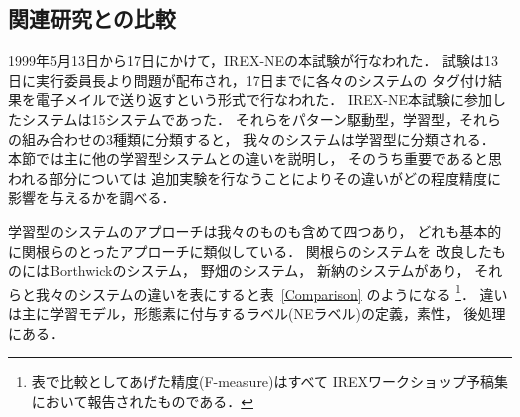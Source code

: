 \subsection{関連研究との比較}
\label{sec:related_work}

1999年5月13日から17日にかけて，IREX-NEの本試験が行なわれた．
試験は13日に実行委員長より問題が配布され，17日までに各々のシステムの
タグ付け結果を電子メイルで送り返すという形式で行なわれた．
IREX-NE本試験に参加したシステムは15システムであった．
それらをパターン駆動型，学習型，それらの組み合わせの3種類に分類すると，
我々のシステムは学習型に分類される．
本節では主に他の学習型システムとの違いを説明し，
そのうち重要であると思われる部分については
追加実験を行なうことによりその違いがどの程度精度に影響を与えるかを調べる．

学習型のシステムのアプローチは我々のものも含めて四つあり，
どれも基本的に関根らのとったアプローチ\cite{Sekine98_wvlc}に類似している．
関根らのシステム\cite{Sekine98_wvlc}を
改良したものにはBorthwickのシステム\cite{borthwick_irex:99}，
野畑のシステム\cite{nova_irex:99}，
新納\cite{shinnou_irex:99}のシステムがあり，
それらと我々のシステムの違いを表にすると表~\ref{Comparison} のようになる
\footnote{
  表で比較としてあげた精度(F-measure)はすべて
  IREXワークショップ予稿集において報告されたものである．
}．
違いは主に学習モデル，形態素に付与するラベル(NEラベル)の定義，素性，
後処理にある．

